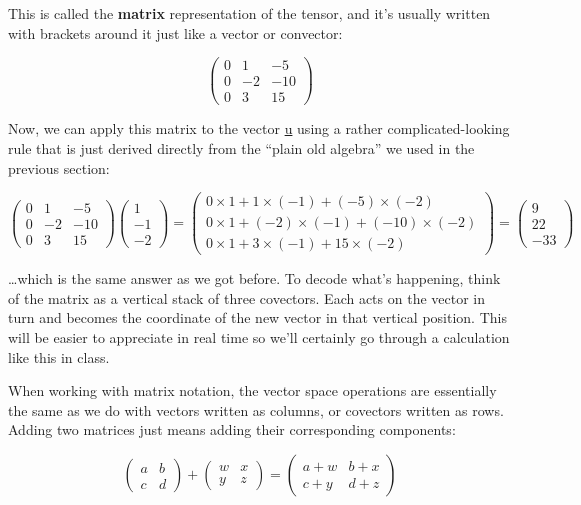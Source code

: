 \documentclass[oneside,english]{amsbook}
\numberwithin{section}{chapter}
\theoremstyle{plain}
\theoremstyle{definition}
\begin{document}
This is called the \textbf{matrix} representation of the tensor, and
it's usually written with brackets around it just like a vector or
convector:

\[\begin{pmatrix}
	0 & 1 & - 5 \\
	0 & - 2 & - 10 \\
	0 & 3 & 15
\end{pmatrix}\]

Now, we can apply this matrix to the vector \ul{u} using a rather
complicated-looking rule that is just derived directly from the ``plain
old algebra'' we used in the previous section:

\[\begin{pmatrix}
	0 & 1 & - 5 \\
	0 & - 2 & - 10 \\
	0 & 3 & 15
\end{pmatrix}\begin{pmatrix}
	1 \\
	- 1 \\
	- 2
\end{pmatrix} = \begin{pmatrix}
	0 \times 1 + 1 \times ( - 1) + ( - 5) \times ( - 2) \\
	0 \times 1 + ( - 2) \times ( - 1) + ( - 10) \times ( - 2) \\
	0 \times 1 + 3 \times ( - 1) + 15 \times ( - 2)
\end{pmatrix} = \begin{pmatrix}
	9 \\
	22 \\
	- 33
\end{pmatrix}\]

\ldots which is the same answer as we got before. To decode what's
happening, think of the matrix as a vertical stack of three covectors.
Each acts on the vector in turn and becomes the coordinate of the new
vector in that vertical position. This will be easier to appreciate in
real time so we'll certainly go through a calculation like this in
class.

When working with matrix notation, the vector space operations are
essentially the same as we do with vectors written as columns, or
covectors written as rows. Adding two matrices just means adding their
corresponding components:

\[\begin{pmatrix}
	a & b \\
	c & d
\end{pmatrix} + \begin{pmatrix}
	w & x \\
	y & z
\end{pmatrix} = \begin{pmatrix}
	a + w & b + x \\
	c + y & d + z
\end{pmatrix}\]
\end{document}
